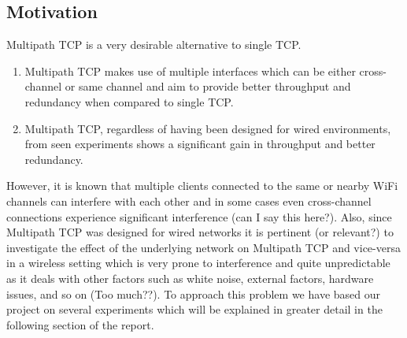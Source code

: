 \subsection{Motivation}
Multipath TCP is a very desirable alternative to single TCP.

\begin{enumerate}
  \item Multipath TCP makes use of multiple interfaces which can be either
    cross-channel or same channel and aim to provide better throughput and
    redundancy when compared to single TCP.
  \item Multipath TCP, regardless of having been designed for wired
    environments, from seen experiments shows a significant gain in throughput
    and better redundancy.
\end{enumerate}

However, it is known that multiple clients connected to the same or nearby WiFi
channels can interfere with each other and in some cases even cross-channel
connections experience significant interference (can I say this here?). Also,
since Multipath TCP was designed for wired networks it is pertinent (or
relevant?) to investigate the effect of the underlying network on Multipath TCP
and vice-versa in a wireless setting which is very prone to interference and
quite unpredictable as it deals with other factors such as white noise, external
factors, hardware issues, and so on (Too much??).  To approach this problem we
have based our project on several experiments which will be explained in greater
detail in the following section of the report.
